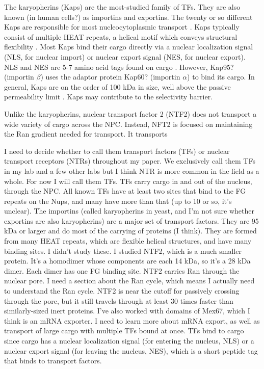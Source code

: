 The karyopherins (Kaps) are the most-studied family of TFs.  They are also known (in human cells?) as importins and exportins.  The twenty or so different Kaps are responsible for most nucleocytoplasmic transport \cite{kapinos17}.  Kaps typically consist of multiple HEAT repeats, a helical motif which conveys structural flexibility \cite{yoshimura16}.  Most Kaps bind their cargo directly via a nuclear localization signal (NLS, for nuclear import) or nuclear export signal (NES, for nuclear export).  NLS and NES are 5-7 amino acid tags found on cargo \cite{}.  However, Kap95? (importin $\beta$) uses the adaptor protein Kap60? (importin $\alpha$) to bind its cargo. In general, Kaps are on the order of 100 kDa in size, well above the passive permeability limit \cite{}. Kaps may contribute to the selectivity barrier.

Unlike the karyopherins, nuclear transport factor 2 (NTF2) does not transport a wide variety of cargo across the NPC.  Instead, NFT2 is focused on maintaining the Ran gradient needed for transport.  It transports 

I need to decide whether to call them transport factors (TFs) or nuclear transport receptors (NTRs) throughout my paper.  We exclusively call them TFs in my lab and a few other labs but I think NTR is more common in the field as a whole.  For now I will call them TFs.  TFs carry cargo in and out of the nucleus, through the NPC.  All known TFs have at least two sites that bind to the FG repeats on the Nups, and many have more than that (up to 10 or so, it's unclear).  The importins (called karyopherins in yeast, and I'm not sure whether exportins are also karyopherins) are a major set of transport factors.  They are 95 kDa or larger and do most of the carrying of proteins (I think).  They are formed from many HEAT repeats, which are flexible helical structures, and have many binding sites.  I didn't study these.  I studied NTF2, which is a much smaller protein.  It's a homodimer whose components are each 14 kDa, so it's a 28 kDa dimer.  Each dimer has one FG binding site.  NTF2 carries Ran through the nuclear pore.  I need a section about the Ran cycle, which means I actually need to understand the Ran cycle.  NTF2 is near the cutoff for passively crossing through the pore, but it still travels through at least 30 times faster than similarly-sized inert proteins.  I've also worked with domains of Mex67, which I think is an mRNA exporter.  I need to learn more about mRNA export, as well as transport of large cargo with multiple TFs bound at once.  TFs bind to cargo since cargo has a nuclear localization signal (for entering the nucleus, NLS) or a nuclear export signal (for leaving the nucleus, NES), which is a short peptide tag that binds to transport factors.
